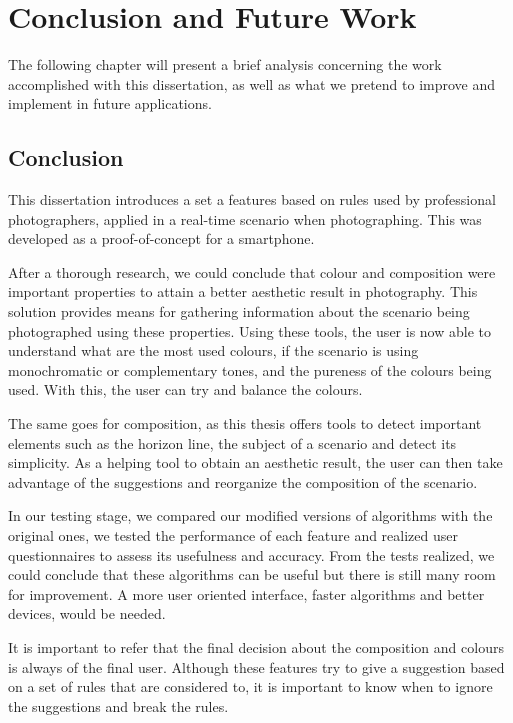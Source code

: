 \chapter{Conclusion and Future Work}
\label{cha:conclusion_future}

The following chapter will present a brief analysis concerning the work accomplished with this dissertation, as well as what we pretend to improve and implement in future applications.

\section{Conclusion}
\label{sec:conclusion}

This dissertation introduces a set a features based on rules used by professional photographers, applied in a real-time scenario when photographing. This was developed as a proof-of-concept for a smartphone.

After a thorough research, we could conclude that colour and composition were important properties to attain a better aesthetic result in photography. This solution provides means for gathering information about the scenario being photographed using these properties. Using these tools, the user is now able to understand what are the most used colours, if the scenario is using monochromatic or complementary tones, and the pureness of the colours being used. With this, the user can try and balance the colours.

The same goes for composition, as this thesis offers tools to detect important elements such as the horizon line, the subject of a scenario and detect its simplicity. As a helping tool to obtain an aesthetic result, the user can then take advantage of the suggestions and reorganize the composition of the scenario. 

In our testing stage, we compared our modified versions of algorithms with the original ones, we tested the performance of each feature and realized user questionnaires to assess its usefulness and accuracy. From the tests realized, we could conclude that these algorithms can be useful but there is still many room for improvement. A more user oriented interface, faster algorithms and better devices, would be needed.

It is important to refer that the final decision about the composition and colours is always of the final user. Although these features try to give a suggestion based on a set of rules that are considered to, it is important to know when to ignore the suggestions and break the rules.

